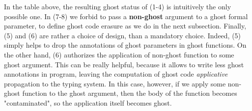 \documentclass[a4paper,11pt,oneside]{article}
\theoremstyle{plain}
\begin{document}
In the table above, the resulting ghost status of (1-4) is intuitively
the only possible one.
In (7-8) we forbid to pass a \textbf{non-ghost} argument to a ghost
formal parameter, to define ghost code erasure as we do in the next subsection. 
Finally, (5) and (6) are rather a choice of design, than a mandatory choice.
Indeed,  (5) simply helps to drop the annotations of ghost parameters in ghost functions. On the other hand, (6) authorizes the application of non-ghost function to some ghost argument. This can be really helpful, because it allows to write less ghost annotations in program, leaving the computation of ghost code \textit{applicative} propagation to the typing system. In this case, however, if we apply some non-ghost function to the ghost argument, then the body of the function becomes "contaminated", so the application itself becomes ghost.
\end{document}
